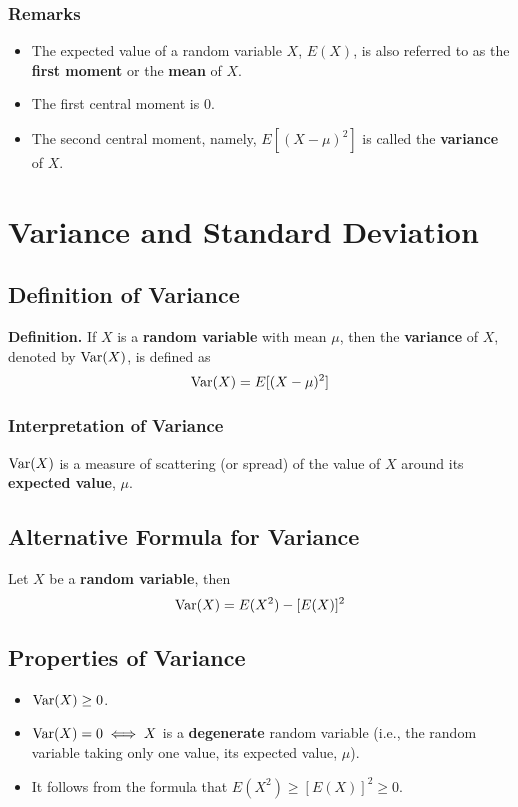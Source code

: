 \documentclass[../st2131_notes.tex]{subfiles}
\begin{document}
\subsubsection{Remarks}
\begin{itemize}
	\item The expected value of a random variable \(X\), \(E(X)\), is also referred to as the \textbf{first moment} or the \textbf{mean} of \(X\).
	\item The first central moment is \(0\).
	\item The second central moment, namely, \(E[(X-\mu)^2]\) is called the \textbf{variance} of \(X\).
\end{itemize}

\section{Variance and Standard Deviation}
\subsection{Definition of Variance}
\textbf{Definition.} If \(X\) is a \textbf{random variable} with mean \(\mu\), then the \textbf{variance} of \(X\), denoted by \(\operatorname{Var}(X)\), is defined as
\[\operatorname{Var}(X)=E[(X-\mu)^2]\]

\subsubsection{Interpretation of Variance}
\(\operatorname{Var}(X)\) is a measure of scattering (or spread) of the value of \(X\) around its \textbf{expected value}, \(\mu\).

\subsection{Alternative Formula for Variance}
Let \(X\) be a \textbf{random variable}, then
\[\operatorname{Var}(X)=E(X^2)-[E(X)]^2\]

\subsection{Properties of Variance}
\begin{itemize}
	\item\(\operatorname{Var}(X)\geq0\).
	\item\(\operatorname{Var}(X)=0\iff X\) is a \textbf{degenerate} random variable (i.e., the random variable taking only one value, its expected value, \(\mu\)).
	\item It follows from the formula that \(E(X^2)\geq[E(X)]^2\geq0\).
\end{itemize}
\end{document}
